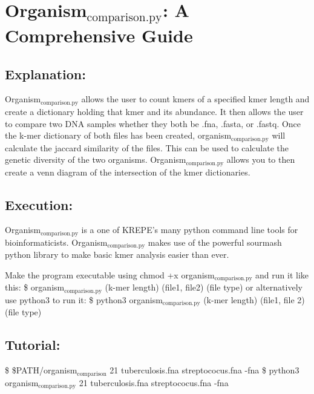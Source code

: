 \documentclass[11pt]{article}
\author{aengus}
\date{\today}
\title{}
\begin{document}
\tableofcontents

\section{Organism\(_{\text{comparison.py}}\): A Comprehensive Guide}
\label{sec:orgb7cf731}

\subsection{Explanation:}
\label{sec:orgbefb4a4}
Organism\(_{\text{comparison.py}}\) allows the user to count kmers of a specified kmer 
length and create a dictionary holding that kmer and its abundance. It 
then allows the user to compare two DNA samples whether they both be .fna,
.fasta, or .fastq. Once the k-mer dictionary of both files has been created,
organism\(_{\text{comparison.py}}\) will calculate the jaccard similarity of the files. 
This can be used to calculate the genetic diversity of the two organisms.
Organism\(_{\text{comparison.py}}\) allows you to then create a venn diagram of the
intersection of the kmer dictionaries.

\subsection{Execution:}
\label{sec:orgea0a059}
Organism\(_{\text{comparison.py}}\) is a one of KREPE's many python command line tools
for bioinformaticists. Organism\(_{\text{comparison.py}}\) makes use of the powerful
sourmash python library to make basic kmer analysis easier than ever.

Make the program executable using chmod +x organism\(_{\text{comparison.py}}\) and run
it like this: 
\$ organism\(_{\text{comparison.py}}\) (k-mer length) (file1, file2) (file type)
or alternatively use python3 to run it: 
\$ python3 organism\(_{\text{comparison.py}}\) (k-mer length) (file1, file 2) (file type)

\subsection{Tutorial:}
\label{sec:org95f3345}
\$ \$PATH/organism\(_{\text{comparison}}\) 21 tuberculosis.fna streptococus.fna -fna
\$ python3 organism\(_{\text{comparison.py}}\) 21 tuberculosis.fna streptococus.fna -fna
\end{document}
